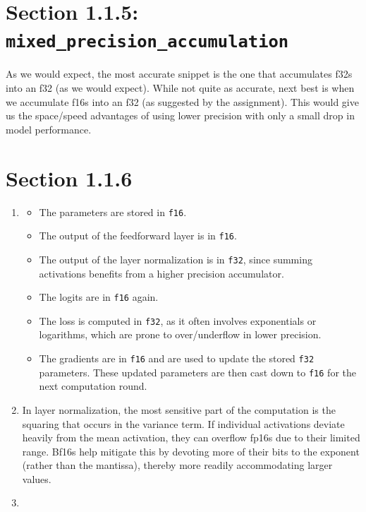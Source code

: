 \documentclass[11pt, letterpaper]{article}
\begin{document}
\section*{Section 1.1.5: \texttt{mixed\_precision\_accumulation}}
As we would expect, the most accurate snippet is the one that accumulates f32s into an f32 (as we would expect). While not quite as accurate, next best is when we accumulate f16s into an f32 (as suggested by the assignment). This would give us the space/speed advantages of using lower precision with only a small drop in model performance.

\section*{Section 1.1.6}
\begin{enumerate}[label=(\alph*)]
    \item
    \begin{itemize}
        \item The parameters are stored in \texttt{f16}.
        \item The output of the feedforward layer is in \texttt{f16}.
        \item The output of the layer normalization is in \texttt{f32}, since summing activations benefits from a higher precision accumulator.
        \item The logits are in \texttt{f16} again.
        \item The loss is computed in \texttt{f32}, as it often involves exponentials or logarithms, which are prone to over/underflow in lower precision.
        \item The gradients are in \texttt{f16} and are used to update the stored \texttt{f32} parameters. These updated parameters are then cast down to \texttt{f16} for the next computation round.
    \end{itemize}
    \item In layer normalization, the most sensitive part of the computation is the squaring that occurs in the variance term. If individual activations deviate heavily from the mean activation, they can overflow fp16s due to their limited range. Bf16s help mitigate this by devoting more of their bits to the exponent (rather than the mantissa), thereby more readily accommodating larger values.
    \item
\end{enumerate}
\end{document}
